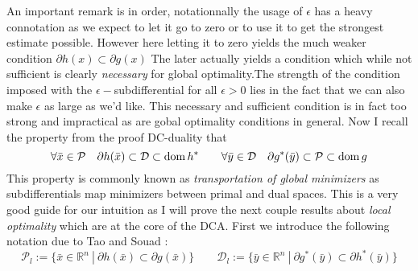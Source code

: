 An important remark is in order, notationnally the
usage of $\epsilon$ has a heavy connotation as we expect to let it go to zero
or to use it to get the strongest estimate possible. However here letting it to
zero yields the much weaker condition $\partial h(x) \subset \partial g(x)$
The later actually yields a condition which while not sufficient is clearly
\emph{necessary} for global optimality.The strength of the condition imposed
with the $\epsilon-$subdifferential for all $\epsilon>0$ lies in the fact that we
can also make $\epsilon$ as large as we'd like. This necessary and sufficient
condition is in fact too strong and impractical as are gobal optimality
conditions in general.  Now I recall the property from the proof DC-duality
that
\begin{equation}
	\forall  \bar x \in \mathcal P \quad \partial h(\bar x)  \subset
	\mathcal D  \subset  \mathrm{dom} \, h^* \qquad \forall \bar y \in \mathcal D
	\quad \partial g^*(\bar y) \subset  \mathcal P \subset \mathrm{dom} \, g	
\end{equation}
This property is commonly known as \emph{transportation of global minimizers}
as subdifferentials map  minimizers between primal and dual spaces. This
is a very good guide for our intuition as I will prove the next couple results
about \emph{local optimality} which are at the core of the DCA. First we
introduce the following
notation due to Tao and Souad \autocite[280]{tao1988duality}:
\begin{equation}
	\mathcal P_l := \{\bar x\in \mathbb R^n\ |\
	\partial h(\bar x)\subset\partial g(\bar x)\} \qquad
	\mathcal D_l := \{\bar y\in \mathbb R^n\ |\ 
	\partial g^*(\bar y) \subset \partial h^*(\bar y)\}
\end{equation}


